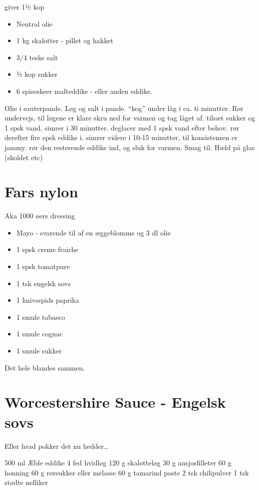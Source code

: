\documentclass[
]{book}
\providecommand{\tightlist}{%
  \setlength{\itemsep}{0pt}\setlength{\parskip}{0pt}}
\begin{document}
giver 1½ kop

\begin{itemize}
\tightlist
\item
  Neutral olie
\item
  1 kg skalotter - pillet og hakket
\item
  3/4 teske salt
\item
  ½ kop sukker
\item
  6 spiseskeer malteddike - eller anden eddike.
\end{itemize}

Olie i sauterpande.
Løg og salt i pande.
``kog'' under låg i ca. ti minutter. Rør undervejs, til løgene er klare
skru ned for varmen og tag låget af.
tilsæt sukker og 1 spsk vand. simrer i 30 minutter. deglacer med 1 spsk vand efter behov.
rør derefter fire spsk eddike i. simrer videre i 10-15 minutter, til konsistensen er jammy.
rør den resterende eddike ind, og sluk for varmen.
Smag til.
Hæld på glas (skoldet etc)

\hypertarget{fars-nylon}{%
\section{Fars nylon}\label{fars-nylon}}

Aka 1000 øers dressing

\begin{itemize}
\tightlist
\item
  Mayo - svarende til af en æggeblomme og 3 dl olie
\item
  1 spsk creme fraiche
\item
  1 spsk tomatpure
\item
  1 tsk engelsk sovs
\item
  1 knivsspids paprika
\item
  1 smule tabasco
\item
  1 smule cognac
\item
  1 smule sukker
\end{itemize}

Det hele blandes sammen.

\hypertarget{worcestershire-sauce---engelsk-sovs}{%
\section{Worcestershire Sauce - Engelsk sovs}\label{worcestershire-sauce---engelsk-sovs}}

Eller hvad pokker det nu hedder\ldots{}

500 ml Æble eddike
4 fed hvidløg
120 g skalotteløg
30 g ansjosfilleter
60 g honning
60 g rørsukker eller melasse
60 g tamarind paste
2 tsk chilipulver
1 tsk stødte nelliker
\end{document}
